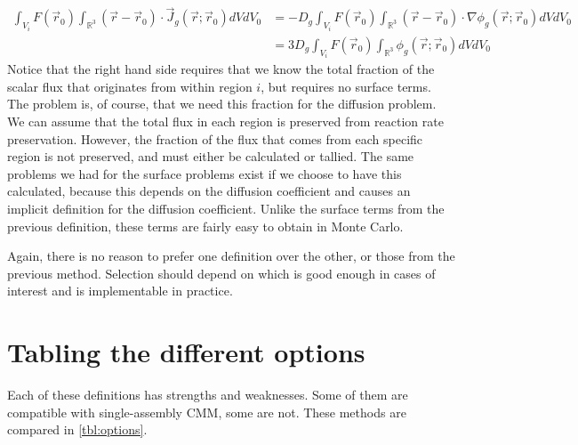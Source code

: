\documentclass[a4paper,letterpaper,12pt,oneside,draft]{article}
\newcommand{\allspace}{\ensuremath{\mathbb{R}^3}}
\newcommand{\vr}{\ensuremath{\vec{r}}}
\newcommand{\dvr}{\left(\vr-\vr_0\right)}
\begin{document}
\begin{align}
    \nonumber
    \int_{V_i} F(\vr_0)\int_{\allspace} \dvr\cdot\vec{J}_g(\vr;\vr_0) dVdV_0 &= -D_g \int_{V_i} F(\vr_0) \int_{\allspace} \dvr\cdot\nabla \phi_g(\vr;\vr_0)dVdV_0 \\\nonumber
    &= 3D_g \int_{V_i}F(\vr_0)\int_{\allspace}\phi_g(\vr;\vr_0)dVdV_0 
\end{align}
Notice that the right hand side requires that we know the total fraction of the scalar flux that originates from within region $i$, but requires no surface terms.
The problem is, of course, that we need this fraction for the diffusion problem. 
We can assume that the total flux in each region is preserved from reaction rate preservation. 
However, the fraction of the flux that comes from each specific region is not preserved, and must either be calculated or tallied.
The same problems we had for the surface problems exist if we choose to have this calculated, because this depends on the diffusion coefficient and causes an implicit definition for the diffusion coefficient.
Unlike the surface terms from the previous definition, these terms are fairly easy to obtain in Monte Carlo.

Again, there is no reason to prefer one definition over the other, or those from the previous method.
Selection should depend on which is good enough in cases of interest and is implementable in practice.

\section{Tabling the different options}

Each of these definitions has strengths and weaknesses. 
Some of them are compatible with single-assembly CMM, some are not.
These methods are compared in \cref{tbl:options}.
\end{document}
